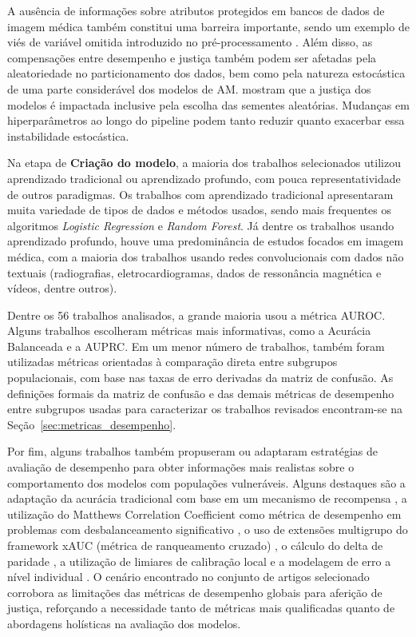 A ausência de informações sobre atributos protegidos em bancos de dados de imagem médica também constitui uma barreira importante,  sendo um exemplo de viés de variável omitida introduzido no pré-processamento \cite{beheshtian2022generalizability,larrazabal2020gender,seyyed2020chexclusion}. Além disso, as compensações entre desempenho e justiça também podem ser afetadas pela aleatoriedade no particionamento dos dados, bem como pela natureza estocástica de uma parte considerável dos modelos de AM. \citet{amir2021impact} mostram que a justiça dos modelos é impactada inclusive pela escolha das sementes aleatórias. Mudanças em hiperparâmetros ao longo do pipeline podem tanto reduzir quanto exacerbar essa instabilidade estocástica.

Na etapa de \textbf{Criação do modelo}, a maioria dos trabalhos selecionados utilizou aprendizado tradicional ou aprendizado profundo, com pouca representatividade de outros paradigmas. Os trabalhos com aprendizado tradicional apresentaram muita variedade de tipos de dados e métodos usados, sendo mais frequentes os algoritmos \emph{Logistic Regression} e \emph{Random Forest}. Já dentre os trabalhos usando aprendizado profundo, houve uma predominância de estudos focados em imagem médica, com a maioria dos trabalhos usando redes convolucionais com dados não textuais (radiografias, eletrocardiogramas, dados de ressonância magnética e vídeos, dentre outros).

Dentre os 56 trabalhos analisados, a grande maioria usou a métrica AUROC. Alguns trabalhos escolheram métricas mais informativas, como a Acurácia Balanceada e a AUPRC. Em um menor número de trabalhos, também foram utilizadas métricas orientadas à comparação direta entre subgrupos populacionais, com base nas taxas de erro derivadas da matriz de confusão. As definições formais da matriz de confusão e das demais métricas de desempenho entre subgrupos usadas para caracterizar os trabalhos revisados encontram-se na Seção~\ref{sec:metricas_desempenho}.

Por fim, alguns trabalhos também propuseram ou adaptaram estratégias de avaliação de desempenho para obter informações mais realistas sobre o comportamento dos modelos com populações vulneráveis. Alguns destaques são a adaptação da acurácia tradicional com base em um mecanismo de recompensa \cite{alday2022age}, a utilização do Matthews Correlation Coefficient como métrica de desempenho em problemas com desbalanceamento significativo \cite{afrose2022subpopulation}, o uso de extensões multigrupo do framework xAUC (métrica de ranqueamento cruzado) \cite{pfohl2021empirical}, o cálculo do delta de paridade \cite{burlina2021addressing}, a utilização de limiares de calibração local \cite{foryciarz2022evaluating} e a modelagem de erro a nível individual \cite{estiri2022objective}. O cenário encontrado no conjunto de artigos selecionado corrobora as limitações das métricas de desempenho globais para aferição de justiça, reforçando a necessidade tanto de métricas mais qualificadas quanto de abordagens holísticas na avaliação dos modelos.

